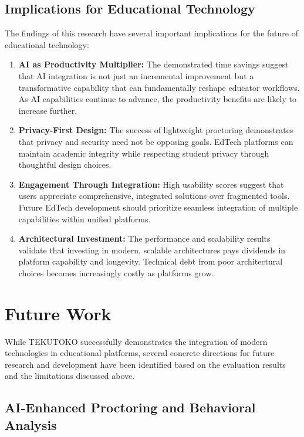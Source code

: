 \subsection{Implications for Educational Technology}

The findings of this research have several important implications for the future of educational technology:

\begin{enumerate}
    \item \textbf{AI as Productivity Multiplier:} The demonstrated time savings suggest that AI integration is not just an incremental improvement but a transformative capability that can fundamentally reshape educator workflows. As AI capabilities continue to advance, the productivity benefits are likely to increase further.
    
    \item \textbf{Privacy-First Design:} The success of lightweight proctoring demonstrates that privacy and security need not be opposing goals. EdTech platforms can maintain academic integrity while respecting student privacy through thoughtful design choices.
    
    \item \textbf{Engagement Through Integration:} High usability scores suggest that users appreciate comprehensive, integrated solutions over fragmented tools. Future EdTech development should prioritize seamless integration of multiple capabilities within unified platforms.
    
    \item \textbf{Architectural Investment:} The performance and scalability results validate that investing in modern, scalable architectures pays dividends in platform capability and longevity. Technical debt from poor architectural choices becomes increasingly costly as platforms grow.
\end{enumerate}

\section{Future Work}
\label{sec:future-work}

While TEKUTOKO successfully demonstrates the integration of modern technologies in educational platforms, several concrete directions for future research and development have been identified based on the evaluation results and the limitations discussed above.

\subsection{AI-Enhanced Proctoring and Behavioral Analysis}

